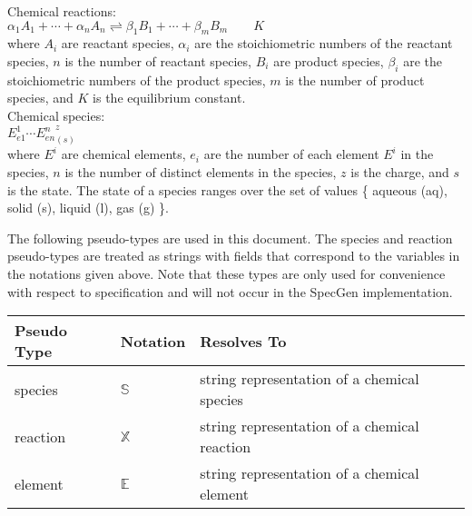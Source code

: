 \documentclass[12pt, titlepage]{article}
\newcommand{\progname}{SpecGen}
\begin{document}
\noindent
Chemical reactions:\\

${\alpha}_1 {A}_{1} + \cdots + {\alpha}_n {A}_{n} 
    \rightleftharpoons {\beta}_1 {B}_{1} + \cdots + {\beta}_m {B}_{m} \qquad K$\\

where $A_i$ are reactant species, $\alpha_i$ are the stoichiometric numbers
of the reactant species, $n$ is the number of reactant species, $B_i$ are product species,
$\beta_i$ are the stoichiometric numbers of the product species, $m$ is the number of
product species, and $K$ is the equilibrium constant.\\

\noindent
Chemical species:\\

${{E}^1_{e1}}\cdots{{E}^n_{en}}^{z}_{(s)}$\\

where $E^i$ are chemical elements, $e_i$ are the number of each element $E^i$ in
the species, $n$ is the number of distinct elements in the species, $z$ is the
charge, and $s$ is the state. The state of a species ranges over the set of values
\{ aqueous (aq), solid (s), liquid (l), gas (g) \}.\\ 


\noindent
The following pseudo-types are used in this document.  The species and 
reaction pseudo-types are treated as strings with fields that correspond to the variables
in the notations given above.  Note that these types are only used for convenience with
respect to specification and
will not occur in the \progname{} implementation.

\begin{center}
\renewcommand{\arraystretch}{1.2}
\noindent 
\begin{tabular}{l l p{7.5cm}} 
\toprule 
\textbf{Pseudo Type} & \textbf{Notation} & \textbf{Resolves To}\\ 
\midrule
species & $\mathbb{S}$ & string representation of a chemical species\\
reaction & $\mathbb{X}$ & string representation of a chemical reaction \\
element & $\mathbb{E}$ & string representation of a chemical element \\
\bottomrule
\end{tabular} 
\end{center}
\end{document}
